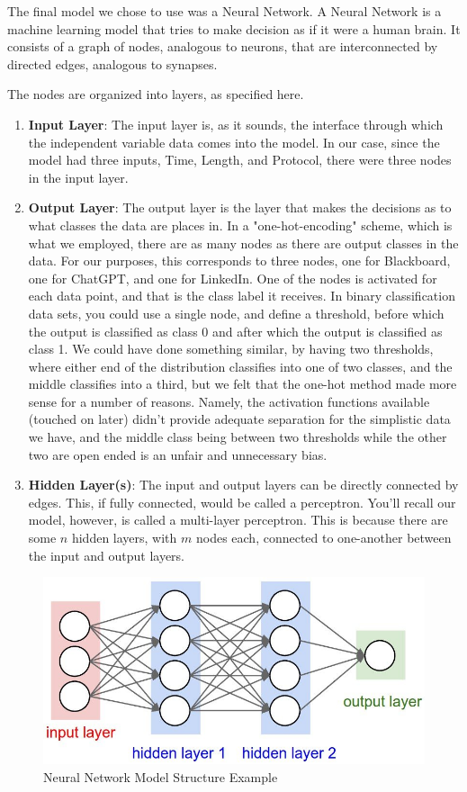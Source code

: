 \documentclass[10pt,sigconf,letterpaper,nonacm]{acmart}
\begin{document}
The final model we chose to use was a Neural Network.
A Neural Network is a machine learning model that tries to make decision as if it were a human brain. 
It consists of a graph of nodes, analogous to neurons, that are interconnected by directed edges, analogous to synapses.

The nodes are organized into layers, as specified here.
\begin{enumerate}
    \item {\bf Input Layer}: The input layer is, as it sounds, the interface through which the independent variable data comes into the model. 
    In our case, since the model had three inputs, Time, Length, and Protocol, there were three nodes in the input layer.
    \item {\bf Output Layer}: The output layer is the layer that makes the decisions as to what classes the data are places in. In a "one-hot-encoding" scheme, which is what we employed, there are as many nodes as there are output classes in the data. For our purposes, this corresponds to three nodes, one for Blackboard, one for ChatGPT, and one for LinkedIn. One of the nodes is activated for each data point, and that is the class label it receives.
    In binary classification data sets, you could use a single node, and define a threshold, before which the output is classified as class 0 and after which the output is classified as class 1.
    We could have done something similar, by having two thresholds, where either end of the distribution classifies into one of two classes, and the middle classifies into a third, but we felt that the one-hot method made more sense for a number of reasons.
    Namely, the activation functions available (touched on later) didn't provide adequate separation for the simplistic data we have, 
    and the middle class being between two thresholds while the other two are open ended is an unfair and unnecessary bias.
    \item {\bf Hidden Layer(s)}: The input and output layers can be directly connected by edges. 
    This, if fully connected, would be called a perceptron. 
    You'll recall our model, however, is called a multi-layer perceptron. 
    This is because there are some $n$ hidden layers, with $m$ nodes each, connected to one-another between the input and output layers.
\end{enumerate}
\begin{figure}
    \centering
    \includegraphics[width=1\linewidth]{Figures_and_Graphs/nn_example.png}
    \caption{Neural Network Model Structure Example}
    \label{fig:nn}
\end{figure}
\end{document}

